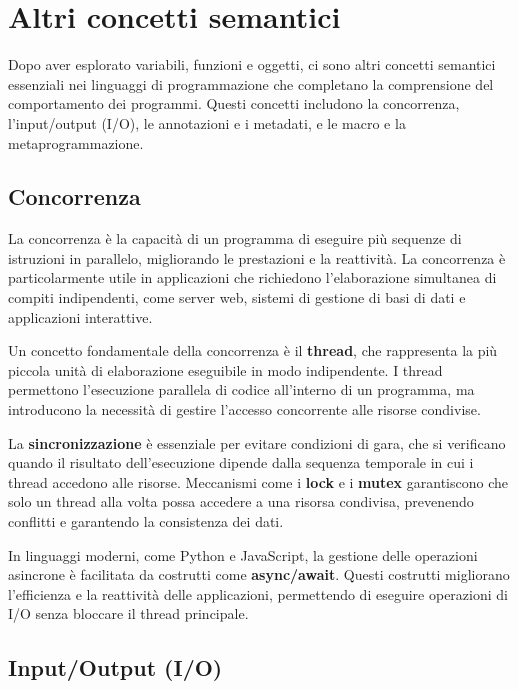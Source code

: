 \documentclass[
  letterpaper,
]{scrbook}
\begin{document}
\chapter{Altri concetti semantici}\label{altri-concetti-semantici}

Dopo aver esplorato variabili, funzioni e oggetti, ci sono altri
concetti semantici essenziali nei linguaggi di programmazione che
completano la comprensione del comportamento dei programmi. Questi
concetti includono la concorrenza, l'input/output (I/O), le annotazioni
e i metadati, e le macro e la metaprogrammazione.

\section{Concorrenza}\label{concorrenza}

La concorrenza è la capacità di un programma di eseguire più sequenze di
istruzioni in parallelo, migliorando le prestazioni e la reattività. La
concorrenza è particolarmente utile in applicazioni che richiedono
l'elaborazione simultanea di compiti indipendenti, come server web,
sistemi di gestione di basi di dati e applicazioni interattive.

Un concetto fondamentale della concorrenza è il \textbf{thread}, che
rappresenta la più piccola unità di elaborazione eseguibile in modo
indipendente. I thread permettono l'esecuzione parallela di codice
all'interno di un programma, ma introducono la necessità di gestire
l'accesso concorrente alle risorse condivise.

La \textbf{sincronizzazione} è essenziale per evitare condizioni di
gara, che si verificano quando il risultato dell'esecuzione dipende
dalla sequenza temporale in cui i thread accedono alle risorse.
Meccanismi come i \textbf{lock} e i \textbf{mutex} garantiscono che solo
un thread alla volta possa accedere a una risorsa condivisa, prevenendo
conflitti e garantendo la consistenza dei dati.

In linguaggi moderni, come Python e JavaScript, la gestione delle
operazioni asincrone è facilitata da costrutti come
\textbf{async/await}. Questi costrutti migliorano l'efficienza e la
reattività delle applicazioni, permettendo di eseguire operazioni di I/O
senza bloccare il thread principale.

\section{Input/Output (I/O)}\label{inputoutput-io}
\end{document}
